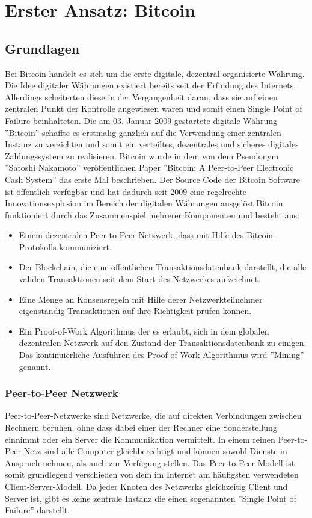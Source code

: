\chapter{Erster Ansatz: Bitcoin}
\label{btc}

\section{Grundlagen}
\label{btc_grundlagen}
Bei Bitcoin handelt es sich um die erste digitale, dezentral organisierte Währung. Die Idee digitaler Währungen existiert bereits seit der Erfindung des Internets. Allerdings scheiterten diese in der Vergangenheit daran, dass sie auf einen zentralen Punkt der Kontrolle angewiesen waren und somit einen Single Point of Failure beinhalteten. Die am 03. Januar 2009 gestartete digitale Währung ''Bitcoin'' schaffte es erstmalig gänzlich auf die Verwendung einer zentralen Instanz zu verzichten und somit ein verteiltes, dezentrales und sicheres digitales Zahlungssystem zu realisieren. Bitcoin wurde in dem von dem Pseudonym ''Satoshi Nakamoto'' veröffentlichen Paper ''Bitcoin: A Peer-to-Peer Electronic Cash System'' das erste Mal beschrieben. \if Der Source Code der Bitcoin Software ist öffentlich verfügbar und hat dadurch seit 2009 eine regelrechte Innovationsexplosion im Bereich der digitalen Währungen ausgelöst.\fi Bitcoin funktioniert durch das Zusammenspiel mehrerer Komponenten und besteht aus:

\begin{itemize}
\item Einem dezentralen Peer-to-Peer Netzwerk, dass mit Hilfe des Bitcoin-Protokolls kommuniziert.
\item Der Blockchain, die eine öffentlichen Transaktionsdatenbank darstellt, die alle validen Transaktionen seit dem Start des Netzwerkes aufzeichnet.
\item Eine Menge an Konsensregeln mit Hilfe derer Netzwerkteilnehmer eigenständig Transaktionen auf ihre Richtigkeit prüfen können.
\item Ein Proof-of-Work Algorithmus der es erlaubt, sich in dem globalen dezentralen Netzwerk auf den Zustand der Transaktionsdatenbank zu einigen. Das kontinuierliche Ausführen des Proof-of-Work Algorithmus wird ''Mining'' genannt.
\end{itemize}

\subsection{Peer-to-Peer Netzwerk}
Peer-to-Peer-Netzwerke sind Netzwerke, die auf direkten Verbindungen zwischen Rechnern beruhen, ohne dass dabei einer der Rechner eine Sonderstellung einnimmt oder ein Server die Kommunikation vermittelt. In einem reinen Peer-to-Peer-Netz sind alle Computer gleichberechtigt und können sowohl Dienste in Anspruch nehmen, als auch zur Verfügung stellen. Das Peer-to-Peer-Modell ist somit grundlegend verschieden von dem im Internet am häufigsten verwendeten Client-Server-Modell. Da jeder Knoten des Netzwerks gleichzeitig Client und Server ist, gibt es keine zentrale Instanz die einen sogenannten ''Single Point of Failure'' darstellt. 

